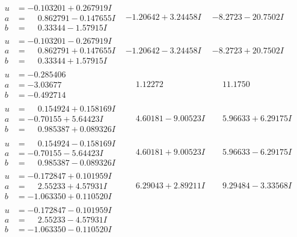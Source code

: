 \documentclass[1p]{elsarticle_modified}
\theoremstyle{definition}
\begin{document}
$$\begin{array}{c|c|c}
\begin{aligned}
u &= -0.103201 + 0.267919 I \\
a &= \phantom{-}0.862791 - 0.147655 I \\
b &= \phantom{-}0.33344 - 1.57915 I\end{aligned}
 & -1.20642 + 3.24458 I & -8.2723 - 20.7502 I \\ \hline\begin{aligned}
u &= -0.103201 - 0.267919 I \\
a &= \phantom{-}0.862791 + 0.147655 I \\
b &= \phantom{-}0.33344 + 1.57915 I\end{aligned}
 & -1.20642 - 3.24458 I & -8.2723 + 20.7502 I \\ \hline\begin{aligned}
u &= -0.285406\phantom{ +0.000000I} \\
a &= -3.03677\phantom{ +0.000000I} \\
b &= -0.492714\phantom{ +0.000000I}\end{aligned}
 & \phantom{-}1.12272\phantom{ +0.000000I} & \phantom{-}11.1750\phantom{ +0.000000I} \\ \hline\begin{aligned}
u &= \phantom{-}0.154924 + 0.158169 I \\
a &= -0.70155 + 5.64423 I \\
b &= \phantom{-}0.985387 + 0.089326 I\end{aligned}
 & \phantom{-}4.60181 - 9.00523 I & \phantom{-}5.96633 + 6.29175 I \\ \hline\begin{aligned}
u &= \phantom{-}0.154924 - 0.158169 I \\
a &= -0.70155 - 5.64423 I \\
b &= \phantom{-}0.985387 - 0.089326 I\end{aligned}
 & \phantom{-}4.60181 + 9.00523 I & \phantom{-}5.96633 - 6.29175 I \\ \hline\begin{aligned}
u &= -0.172847 + 0.101959 I \\
a &= \phantom{-}2.55233 + 4.57931 I \\
b &= -1.063350 + 0.110520 I\end{aligned}
 & \phantom{-}6.29043 + 2.89211 I & \phantom{-}9.29484 - 3.33568 I \\ \hline\begin{aligned}
u &= -0.172847 - 0.101959 I \\
a &= \phantom{-}2.55233 - 4.57931 I \\
b &= -1.063350 - 0.110520 I\end{aligned}

\end{array}$$
\end{document}

